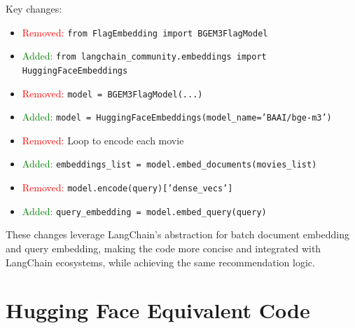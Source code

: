 \documentclass[11pt, a4paper]{article}
\begin{document}
Key changes:
\begin{itemize}
    \item \textcolor{red}{Removed:} \texttt{from FlagEmbedding import BGEM3FlagModel}
    \item \textcolor{green}{Added:} \texttt{from langchain\_community.embeddings import HuggingFaceEmbeddings}
    \item \textcolor{red}{Removed:} \texttt{model = BGEM3FlagModel(...)}
    \item \textcolor{green}{Added:} \texttt{model = HuggingFaceEmbeddings(model\_name='BAAI/bge-m3')}
    \item \textcolor{red}{Removed:} Loop to encode each movie
    \item \textcolor{green}{Added:} \texttt{embeddings\_list = model.embed\_documents(movies\_list)}
    \item \textcolor{red}{Removed:} \texttt{model.encode(query)['dense\_vecs']}
    \item \textcolor{green}{Added:} \texttt{query\_embedding = model.embed\_query(query)}
\end{itemize}

These changes leverage LangChain's abstraction for batch document embedding and query embedding, making the code more concise and integrated with LangChain ecosystems, while achieving the same recommendation logic.

\section{Hugging Face Equivalent Code}
\end{document}
